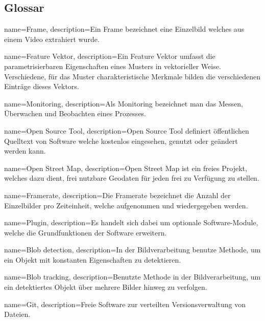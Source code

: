 \subsection{Glossar}

{
  name=Frame,
  description={Ein Frame bezeichnet eine Einzelbild welches aus einem Video extrahiert wurde. \cite{frame}}
}

{
  name=Feature Vektor,
  description={Ein Feature Vektor umfasst die parametrisierbaren Eigenschaften eines Musters in vektorieller Weise. Verschiedene, für das Muster charakteristische Merkmale bilden die verschiedenen Einträge dieses Vektors. \cite{featureVector}}
}

{
  name=Monitoring,
  description={Als Monitoring bezeichnet man das Messen, Überwachen und Beobachten eines Prozesses. \cite{monitoring}}
}

{
  name=Open Source Tool,
  description={Open Source Tool definiert öffentlichen Quelltext von Software welche kostenlos eingesehen, genutzt oder geändert werden kann. \cite{ost}}
}

{
  name=Open Street Map,
  description={Open Street Map ist ein freies Projekt, welches dazu dient, frei nutzbare Geodaten für jeden frei zu Verfügung zu stellen. \cite{osm}}
}

{
  name=Framerate,
  description={Die Framerate bezeichnet die Anzahl der Einzelbilder pro Zeiteinheit, welche aufgenommen und wiedergegeben werden. \cite{framerate}}
}

{
  name=Plugin,
  description={Es handelt sich dabei um optionale Software-Module, welche die Grundfunktionen der Software erweitern. \cite{plugin}}
}

{
  name=Blob detection,
  description={In der Bildverarbeitung benutze Methode, um ein Objekt mit konstanten Eigenschaften zu detektieren. \cite{blobDet}}
}

{
  name=Blob tracking,
  description={Benutzte Methode in der Bildverarbeitung, um ein detektiertes Objekt über mehrere Bilder hinweg zu verfolgen.}
}


{
  name=Git,
  description={Freie Software zur verteilten Versionsverwaltung von Dateien. \cite{git}}
}

